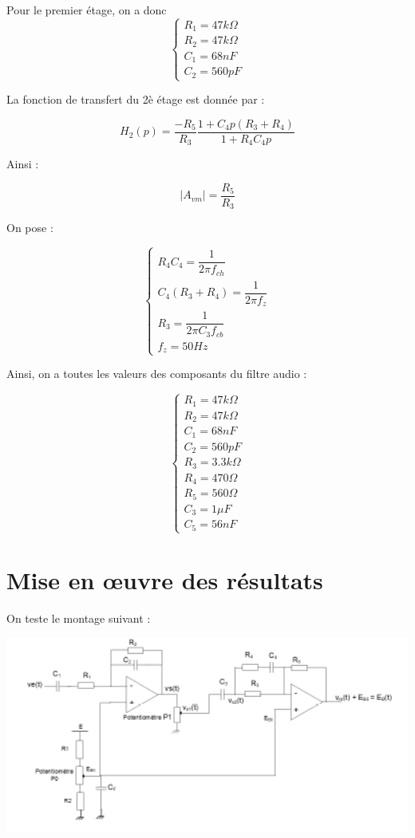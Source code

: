 \documentclass[a4paper]{report}
\begin{document}
Pour le premier étage, on a donc \\
$$\left\{
\begin{array}{l}
  R_1 = 47k\Omega\\
  R_2 = 47k\Omega\\
  C_1 = 68nF\\
  C_2 = 560pF
\end{array}
\right.$$

La fonction de transfert du 2è étage est donnée par :

$$H_2(p) = \dfrac{-R_5}{R_3}\dfrac{1+C_4p(R_3+R_4)}{1+R_4C_4p}$$

Ainsi :

$$|A_{vm}| = \dfrac{R_5}{R_3}$$

On pose :

$$\left\{
\begin{array}{l}
  R_4C_4 = \dfrac{1}{2\pi f_{ch}}\\
  C_4(R_3+R_4) = \dfrac{1}{2\pi f_z}\\
  R_3 = \dfrac{1}{2\pi C_3f_{cb}}\\
  f_z = 50Hz
\end{array}
\right.$$
\newline
\newline

Ainsi, on a toutes les valeurs des composants du filtre audio :


$$\left\{
\begin{array}{l}
  R_1 = 47k\Omega\\
  R_2 = 47k\Omega\\
  C_1 = 68nF\\
  C_2 = 560pF\\
  R_3 = 3.3k\Omega\\
  R_4 = 470\Omega\\
  R_5 = 560\Omega\\
  C_3 = 1\mu F\\
  C_5 = 56nF
\end{array}
\right.$$
\newline
\newline

\section{Mise en \oe uvre des résultats}

On teste le montage suivant :

\begin{center}
\includegraphics[width=1\textwidth]{montage_filtre_audio_complet.PNG}
\end{center}
\end{document}
